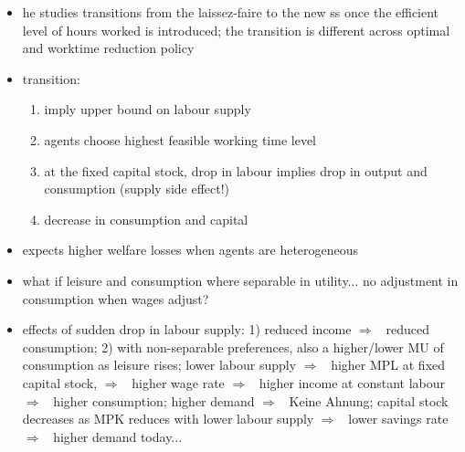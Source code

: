 \documentclass[12pt]{article}
\newcommand{\ar}{$\Rightarrow$ \ }
\begin{document}
\begin{itemize}
\begin{itemize}
\item he studies transitions from the laissez-faire to the new ss once the efficient level of hours worked is introduced; the transition is different across optimal and worktime reduction policy
\item transition:
\begin{enumerate}
\item imply upper bound on labour supply
\item agents choose highest feasible working time level
\item at the fixed capital stock, drop in labour implies drop in output and consumption (supply side effect!)
\item decrease in consumption and capital 
\end{enumerate}
\item expects higher welfare losses when agents are heterogeneous
\item what if leisure and consumption where separable in utility... no adjustment in consumption when wages adjust?
\item effects of sudden drop in labour supply: 1) reduced income \ar reduced consumption; 2) with non-separable preferences, also a higher/lower MU of consumption as leisure rises;
lower labour supply \ar higher MPL at fixed capital stock, \ar higher wage rate \ar higher income at constant labour \ar higher consumption;
higher demand \ar Keine Ahnung;
capital stock decreases as MPK reduces with lower labour supply \ar lower savings rate\ar higher demand today... 
\end{itemize}
\end{itemize}
\end{document}
